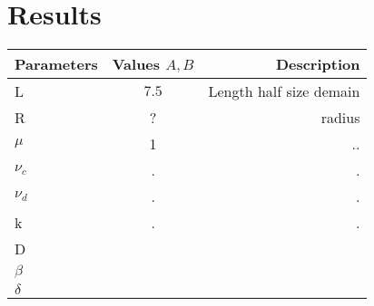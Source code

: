 \section{Results}

	\begin{center}
	\begin{tabular}{ l | c | r }
		\hline
		Parameters & Values $A, B$ & Description \\ \hline
		L & $7.5$ & Length half size demain  \\ 
		R & ? &  radius \\
	
		$\mu$ & 1  & ..\\
		$\nu_c$  & .&  . \\
		$\nu_d$  & .&  . \\
		k & . & .\\
		D & & \\
		$\beta$ & & \\
		$\delta$ & & \\
		\hline
	\end{tabular}
\end{center}	




%			


%	

